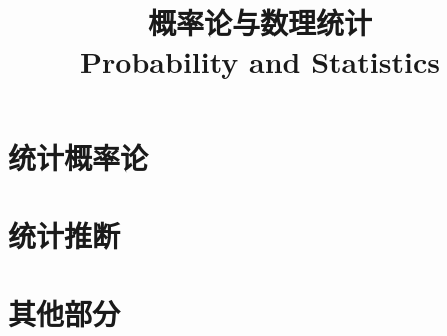 \documentclass{../thunote}
\begin{document}
\title{概率论与数理统计\\Probability and Statistics}
\maketitle

\frontmatter
\tableofcontents


\mainmatter
\part{统计概率论}







\part{统计推断}







\part{其他部分}




\end{document}
